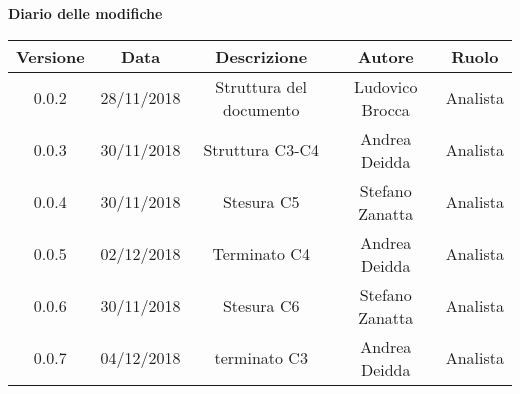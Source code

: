 \begin{center}
		\textbf{Diario delle modifiche}
	\end{center}
	\begin{center}
		\begin{tabular}{|c|c|c|c|c|}
			\hline
			\textbf{Versione} & \textbf{Data} & \textbf{Descrizione} & \textbf{Autore} & \textbf{Ruolo} \\
			\hline 
			0.0.2 & 28/11/2018 & Struttura del documento & Ludovico Brocca & Analista\\
			\hline
			0.0.3 & 30/11/2018 & Struttura C3-C4 & Andrea Deidda & Analista \\
			\hline
			0.0.4 & 30/11/2018 & Stesura C5 & Stefano Zanatta & Analista \\
			\hline
			0.0.5 & 02/12/2018 & Terminato C4 & Andrea Deidda & Analista \\
			\hline
			0.0.6 & 30/11/2018 & Stesura C6 & Stefano Zanatta & Analista \\
			\hline
			0.0.7 & 04/12/2018 & terminato C3 & Andrea Deidda & Analista \\
			\hline
		\end{tabular}
	\end{center}
\newpage